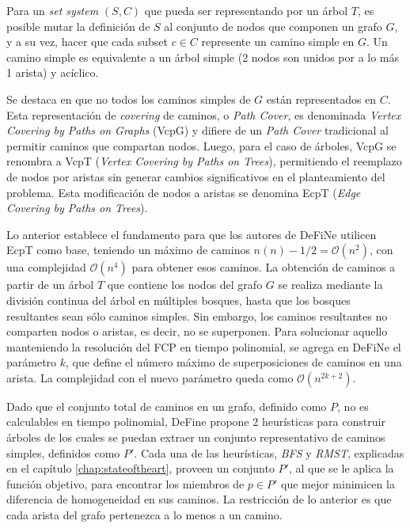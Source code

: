 
Para un {\it set system} $(S,C)$ que pueda ser representando por un \'arbol $T$, es posible mutar la definici\'on de $S$ al conjunto de nodos que componen un grafo $G$, y a su vez, hacer que cada subset $c \in C$ represente un camino simple en $G$. Un camino simple es equivalente a un \'arbol simple (2 nodos son unidos por a lo m\'as 1 arista) y ac\'iclico.


Se destaca en \cite{lin2006vertex} que no todos los caminos simples de $G$ est\'an representados en $C$. Esta representaci\'on de {\it covering} de caminos, o {\it Path Cover}, es denominada {\it Vertex Covering by Paths on Graphs} (VcpG) y difiere de un {\it Path Cover} tradicional al permitir caminos que compartan nodos. Luego, para el caso de \'arboles, VcpG se renombra a VcpT ({\it Vertex Covering by Paths on Trees}), permitiendo el reemplazo de nodos por aristas sin generar cambios significativos en el planteamiento del problema. Esta modificaci\'on de nodos a aristas se denomina EcpT ({\it Edge Covering by Paths on Trees}). %


Lo anterior establece el fundamento para que los autores de DeFiNe\cite{breuer2015define} utilicen EcpT como base, teniendo un m\'aximo de caminos $n(n)-1/2 = \mathcal{O}(n^{2})$, con una complejidad $\mathcal{O}(n^{4})$ para obtener esos caminos. La obtenci\'on de caminos a partir de un \'arbol $T$ que contiene los nodos del grafo $G$ se realiza mediante la divisi\'on continua del \'arbol en m\'ultiples bosques, hasta que los bosques resultantes sean s\'olo caminos simples. Sin embargo, los caminos resultantes no comparten nodos o aristas, es decir, no se superponen. Para solucionar aquello manteniendo la resoluci\'on del FCP en tiempo polinomial, se agrega en DeFiNe el par\'ametro $k$, que define el n\'umero m\'aximo de superposiciones de caminos en una arista. La complejidad con el nuevo par\'ametro queda como $\mathcal{O}(n^{2k+2})$.


Dado que el conjunto total de caminos en un grafo, definido como $P$, no es calculables en tiempo polinomial, DeFine propone 2 heur\'isticas para construir \'arboles de los cuales se puedan extraer un conjunto representativo de caminos simples, definidos como $P'$. Cada una de las heur\'isticas, {\it BFS} y {\it RMST}, explicadas en el cap\'itulo \ref{chap:stateoftheart}, proveen un conjunto $P'$, al que se le aplica la funci\'on objetivo, para encontrar los miembros de $p \in P'$ que mejor minimicen la diferencia de homogeneidad en sus caminos. La restricci\'on de lo anterior es que cada arista del grafo pertenezca a lo menos a un camino. 

